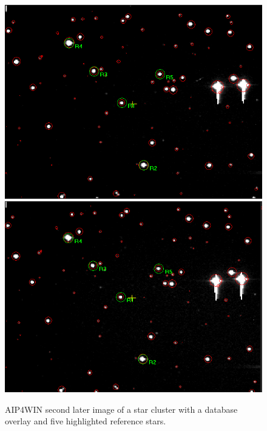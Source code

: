 \documentclass[12pt]{article}
\begin{document}
\begin{figure}[H]
\begin{multicols}{2}
\centering
\includegraphics[scale=0.5]{Images/S2/dcdreference.PNG}
\includegraphics[scale=0.5]{Images/S2/dadreference.PNG}
\end{multicols}
\caption{AIP4WIN second later image of a star cluster with a database overlay and five highlighted reference stars.}
\label{Reference}
\end{figure}
\end{document}
